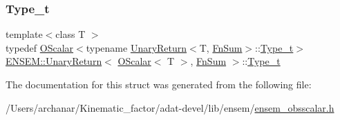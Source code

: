 \mbox{\label{structENSEM_1_1UnaryReturn_3_01OScalar_3_01T_01_4_00_01FnSum_01_4_a02ee406ef93cadbda63ffae33a8ef25a}} 
\subsubsection{\texorpdfstring{Type\_t}{Type\_t}\hspace{0.1cm}{\footnotesize\ttfamily [3/3]}}
{\footnotesize\ttfamily template$<$class T $>$ \\
typedef \mbox{\hyperlink{classENSEM_1_1OScalar}{O\+Scalar}}$<$typename \mbox{\hyperlink{structENSEM_1_1UnaryReturn}{Unary\+Return}}$<$T, \mbox{\hyperlink{structENSEM_1_1FnSum}{Fn\+Sum}}$>$\+::\mbox{\hyperlink{structENSEM_1_1UnaryReturn_3_01OScalar_3_01T_01_4_00_01FnSum_01_4_a02ee406ef93cadbda63ffae33a8ef25a}{Type\+\_\+t}}$>$ \mbox{\hyperlink{structENSEM_1_1UnaryReturn}{E\+N\+S\+E\+M\+::\+Unary\+Return}}$<$ \mbox{\hyperlink{classENSEM_1_1OScalar}{O\+Scalar}}$<$ T $>$, \mbox{\hyperlink{structENSEM_1_1FnSum}{Fn\+Sum}} $>$\+::\mbox{\hyperlink{structENSEM_1_1UnaryReturn_3_01OScalar_3_01T_01_4_00_01FnSum_01_4_a02ee406ef93cadbda63ffae33a8ef25a}{Type\+\_\+t}}}



The documentation for this struct was generated from the following file\+:\begin{DoxyCompactItemize}
\item 
/\+Users/archanar/\+Kinematic\+\_\+factor/adat-\/devel/lib/ensem/\mbox{\hyperlink{adat-devel_2lib_2ensem_2ensem__obsscalar_8h}{ensem\+\_\+obsscalar.\+h}}\end{DoxyCompactItemize}
